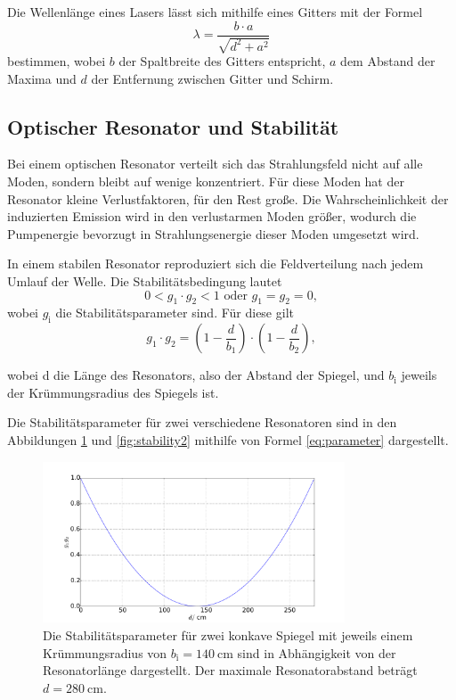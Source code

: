 Die Wellenlänge eines Lasers lässt sich mithilfe eines Gitters mit der Formel 
\begin{equation}
    \lambda = \frac{b \cdot a}{\sqrt{d^2 + a^2}}
    \label{eq:welle}
\end{equation}
bestimmen, wobei $b$ der Spaltbreite des Gitters entspricht, $a$ dem Abstand der Maxima und $d$ der Entfernung zwischen Gitter und Schirm.

\subsection{Optischer Resonator und Stabilität}
Bei einem optischen Resonator verteilt sich das Strahlungsfeld nicht auf alle Moden, sondern bleibt auf wenige konzentriert. Für diese Moden hat der Resonator kleine Verlustfaktoren, für den Rest große. Die Wahrscheinlichkeit der induzierten Emission wird in den verlustarmen Moden größer, wodurch die Pumpenergie bevorzugt in Strahlungsenergie dieser Moden umgesetzt wird. \cite{Laserspektroskopie}

In einem stabilen Resonator reproduziert sich die Feldverteilung nach jedem Umlauf der Welle.
Die Stabilitätsbedingung lautet
\begin{equation}
    0 < g_1 \cdot g_2 < 1 \text{ oder } g_1 = g_2 = 0,
    \label{eq:stabilitaet}
\end{equation}
wobei $g_\text{i}$ die Stabilitätsparameter sind.
Für diese gilt
\begin{equation}
    g_1 \cdot g_2 = \left(1-\frac{d}{b_1} \right)\cdot\left(1-\frac{d}{b_2} \right),
    \label{eq:parameter}
\end{equation}

wobei d die Länge des Resonators, also der Abstand der Spiegel, und $b_\text{i}$ jeweils der Krümmungsradius des Spiegels ist. \cite{Laserspektroskopie}

Die Stabilitätsparameter für zwei verschiedene Resonatoren sind in den Abbildungen \ref{fig:stability1} und \ref{fig:stability2} mithilfe von Formel \ref{eq:parameter} dargestellt.

\begin{figure}
    \centering
    \includegraphics[width=0.8\textwidth]{plots/stability1.pdf}
    \caption{Die Stabilitätsparameter für zwei konkave Spiegel mit jeweils einem Krümmungsradius von $b_\text{i} = \SI{140}{\centi\meter}$ sind in Abhängigkeit von der Resonatorlänge dargestellt. Der maximale Resonatorabstand beträgt $d = \SI{280}{\centi\meter}$.}
    \label{fig:stability1}
\end{figure}

